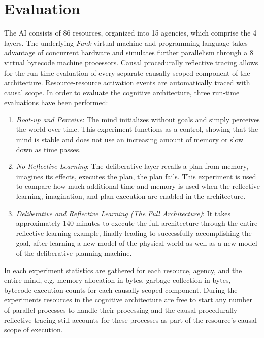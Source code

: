 \chapter{Evaluation}
\label{chapter:evaluation}

The AI consists of 86 resources, organized into 15 agencies, which
comprise the 4 layers.  The underlying \emph{Funk} virtual machine and
programming language \cite[]{morgan:2009} takes advantage of
concurrent hardware and simulates further parallelism through a 8
virtual bytecode machine processors.  Causal procedurally reflective
tracing allows for the run-time evaluation of every separate causally
scoped component of the architecture.  Resource-resource activation
events are automatically traced with causal scope.  In order to
evaluate the cognitive architecture, three run-time evaluations have
been performed:
\begin{enumerate}
\item \emph{Boot-up and Perceive}: The mind initializes without goals
  and simply perceives the world over time.  This experiment functions
  as a control, showing that the mind is stable and does not use an
  increasing amount of memory or slow down as time passes.
\item \emph{No Reflective Learning}: The deliberative layer recalls a
  plan from memory, imagines its effects, executes the plan, the plan
  fails.  This experiment is used to compare how much additional time
  and memory is used when the reflective learning, imagination, and
  plan execution are enabled in the architecture.
\item \emph{Deliberative and Reflective Learning (The Full
  Architecture)}: It takes approximately 140 minutes to execute the
  full architecture through the entire reflective learning example,
  finally leading to successfully accomplishing the goal, after
  learning a new model of the physical world as well as a new model of
  the deliberative planning machine.
\end{enumerate}

In each experiment statistics are gathered for each resource, agency,
and the entire mind, e.g. memory allocation in bytes, garbage
collection in bytes, bytecode execution counts for each causally
scoped component.  During the experiments resources in the cognitive
architecture are free to start any number of parallel processes to
handle their processing and the causal procedurally reflective tracing
still accounts for these processes as part of the resource's causal
scope of execution.

